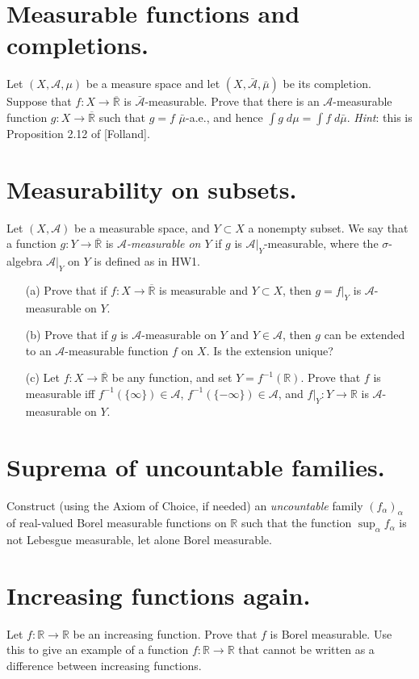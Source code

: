 \documentclass[lang=cn,11pt]{elegantbook}
\begin{document}
\section{Measurable functions and completions.}
  Let $(X,\mathcal{A},\mu)$ be a measure space and let $(X, \bar{\mathcal{A}}, \bar{\mu})$ be its completion. 
Suppose that $f\colon X\to\overline{\mathbb{R}}$ is $\bar{\mathcal{A}}$-measurable. Prove that there is an $\mathcal{A}$-measurable function $g\colon X\to\overline{\mathbb{R}}$ such that $g=f$ $\bar{\mu}$-a.e.,  and hence $\int g  \;d\mu=\int f \;d\bar{\mu}$. 
\textit{Hint}: this is Proposition 2.12 of [Folland].

\section{Measurability on subsets.}
  Let $(X,\mathcal{A})$ be a measurable space, and $Y\subset X$ a nonempty subset.
  We say that a function $g\colon Y\to\overline{\mathbb{R}}$ is \emph{$\mathcal{A}$-measurable on $Y$} if $g$ is $\mathcal{A}|_Y$-measurable, where the $\sigma$-algebra $\mathcal{A}|_Y$ on $Y$ is defined as in HW1.
  \begin{itemize}
  \item[(a)]
    Prove that if $f\colon X\to\overline{\mathbb{R}}$ is measurable and $Y\subset X$, then $g=f|_Y$ is $\mathcal{A}$-measurable on $Y$. 
  \item[(b)]
    Prove that if $g$ is $\mathcal{A}$-measurable on $Y$ and $Y\in \mathcal{A}$, then $g$ can be extended to an $\mathcal{A}$-measurable function $f$ on $X$. Is the extension unique?
  \item[(c)]
    Let $f\colon X\to\overline{\mathbb{R}}$ be any function, and set $Y=f^{-1}(\mathbb{R})$. Prove that $f$ is measurable iff $f^{-1}(\{\infty\})\in \mathcal{A}$, $f^{-1}(\{-\infty\})\in \mathcal{A}$, and 
    $f|_Y\colon Y\to\mathbb{R}$ is $\mathcal{A}$-measurable on $Y$.
  \end{itemize}

\section{Suprema of uncountable families.}
  Construct (using the Axiom of Choice, if needed) an \emph{uncountable} family $(f_\alpha)_\alpha$ of real-valued Borel measurable functions on $\mathbb{R}$ such that the function $\sup_\alpha f_\alpha$ is not Lebesgue measurable, let alone Borel measurable.

\section{Increasing functions again.}
  Let $f\colon\mathbb{R}\to\mathbb{R}$ be an increasing function. Prove that $f$ is Borel measurable. Use this to give an example of a function $f\colon\mathbb{R}\to\mathbb{R}$ that cannot be written as a difference between increasing functions.
\end{document}
